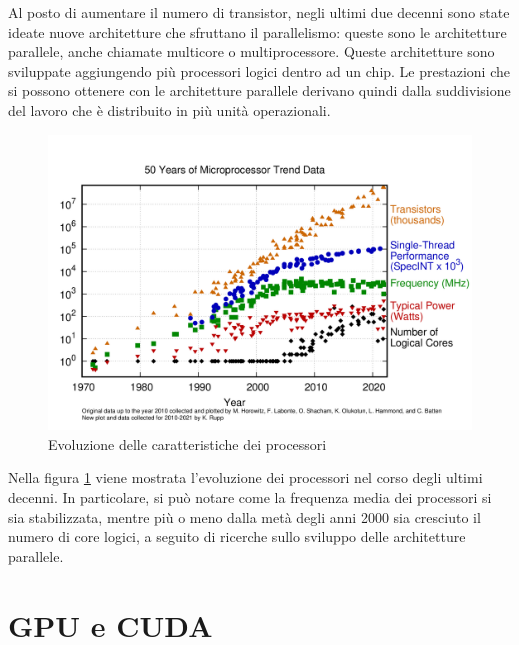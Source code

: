 \documentclass[12pt,a4paper,openright,twoside]{report}
\begin{document}
Al posto di aumentare il numero di transistor, negli ultimi due decenni sono state ideate nuove architetture che sfruttano il parallelismo: queste sono le architetture parallele, anche chiamate multicore o multiprocessore. Queste architetture sono sviluppate aggiungendo più processori logici dentro ad un chip. Le prestazioni che si possono ottenere con le architetture parallele derivano quindi dalla suddivisione del lavoro che è distribuito in più unità operazionali.


\begin{figure}[h]
\centering{}
\includegraphics[width=\textwidth]{50-years-processor-trend.png}
\caption{Evoluzione delle caratteristiche dei processori}
\label{img:trend_proc}
\end{figure}

Nella figura \ref{img:trend_proc} viene mostrata l'evoluzione dei processori nel corso degli ultimi decenni. In particolare, si può notare come la frequenza media dei processori si sia stabilizzata, mentre più o meno dalla metà degli anni 2000 sia cresciuto il numero di core logici, a seguito di ricerche sullo sviluppo delle architetture parallele.

\section{GPU e CUDA}
\end{document}
